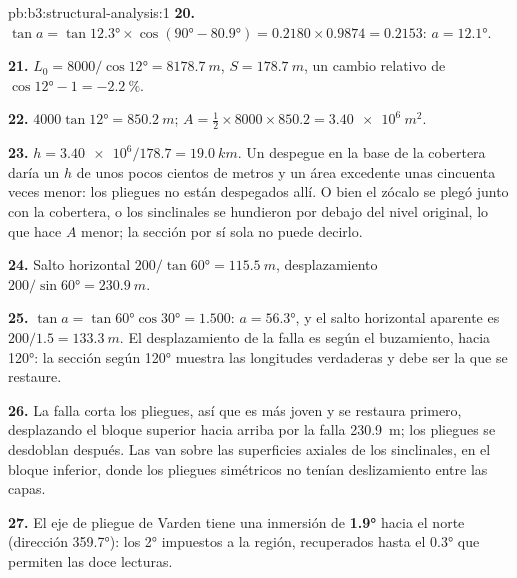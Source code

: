 \begin{solution}{pb:b3:structural-analysis:1}
\textbf{20.} $\tan a = \tan\ang{12.3}\times\cos(\ang{90} - \ang{80.9}) =
0.2180\times0.9874 = 0.2153$: $a = \ang{12.1}$.

\textbf{21.} $L_0 = 8000/\cos\ang{12} = \qty{8178.7}{m}$, $S =
\qty{178.7}{m}$, un cambio relativo de $\cos\ang{12} - 1 =
\qty{-2.2}{\percent}$.

\textbf{22.} $4000\tan\ang{12} = \qty{850.2}{m}$; $A = \tfrac12\times8000\times
850.2 = \qty{3.40e6}{m^2}$.

\textbf{23.} $h = \num{3.40e6}/178.7 = \qty{19.0}{km}$. Un despegue en la
base de la cobertera daría un $h$ de unos pocos cientos de metros y un área excedente
unas cincuenta veces menor: los pliegues no están despegados allí. O bien el
zócalo se plegó junto con la cobertera, o los sinclinales se hundieron por debajo del
nivel original, lo que hace $A$ menor; la sección por sí sola no puede decirlo.

\textbf{24.} Salto horizontal $200/\tan\ang{60} = \qty{115.5}{m}$, desplazamiento $200/\sin\ang{60}
= \qty{230.9}{m}$.

\textbf{25.} $\tan a = \tan\ang{60}\cos\ang{30} = 1.500$: $a = \ang{56.3}$, y
el salto horizontal aparente es $200/1.5 = \qty{133.3}{m}$. El desplazamiento de la falla es
según el buzamiento, hacia \ang{120}: la sección según \ang{120} muestra las
longitudes verdaderas y debe ser la que se restaure.

\textbf{26.} La falla corta los pliegues, así que es más joven y se restaura primero,
desplazando el bloque superior hacia arriba por la falla \qty{230.9}{m}; los pliegues se
desdoblan después. Las  van sobre las superficies axiales de los sinclinales, en el
bloque inferior, donde los pliegues simétricos no tenían deslizamiento entre las capas.

\textbf{27.} El eje de pliegue de Varden tiene una inmersión de
\textbf{\ang[text-series-to-math=true]{1.9}} hacia el norte (dirección
\ang{359.7}): los \ang{2} impuestos a la región, recuperados hasta el
\ang{0.3} que permiten las doce lecturas.
\end{solution}
